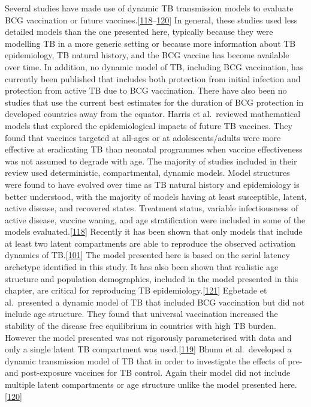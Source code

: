 \documentclass[11pt,twoside]{bristolthesis}
\begin{document}
  Several studies have made use of dynamic TB transmission models to evaluate BCG vaccination or future vaccines.{[}\protect\hyperlink{ref-Harris2016}{118}--\protect\hyperlink{ref-Bhunu2008b}{120}{]} In general, these studies used less detailed models than the one presented here, typically because they were modelling TB in a more generic setting or because more information about TB epidemiology, TB natural history, and the BCG vaccine has become available over time. In addition, no dynamic model of TB, including BCG vaccination, has currently been published that includes both protection from initial infection and protection from active TB due to BCG vaccination. There have also been no studies that use the current best estimates for the duration of BCG protection in developed countries away from the equator. Harris et al.~reviewed mathematical models that explored the epidemiological impacts of future TB vaccines. They found that vaccines targeted at all-ages or at adolescents/adults were more effective at eradicating TB than neonatal programmes when vaccine effectiveness was not assumed to degrade with age. The majority of studies included in their review used deterministic, compartmental, dynamic models. Model structures were found to have evolved over time as TB natural history and epidemiology is better understood, with the majority of models having at least susceptible, latent, active disease, and recovered states. Treatment status, variable infectiousness of active disease, vaccine waning, and age stratification were included in some of the models evaluated.{[}\protect\hyperlink{ref-Harris2016}{118}{]} Recently it has been shown that only models that include at least two latent compartments are able to reproduce the observed activation dynamics of TB.{[}\protect\hyperlink{ref-Ragonnet2017}{101}{]} The model presented here is based on the serial latency archetype identified in this study. It has also been shown that realistic age structure and population demographics, included in the model presented in this chapter, are critical for reproducing TB epidemiology.{[}\protect\hyperlink{ref-Brooks-Pollock2010}{121}{]} Egbetade et al.~presented a dynamic model of TB that included BCG vaccination but did not include age structure. They found that universal vaccination increased the stability of the disease free equilibrium in countries with high TB burden. However the model presented was not rigorously parameterised with data and only a single latent TB compartment was used.{[}\protect\hyperlink{ref-Egbetade2011a}{119}{]} Bhunu et al.~developed a dynamic transmission model of TB that in order to investigate the effects of pre- and post-exposure vaccines for TB control. Again their model did not include multiple latent compartments or age structure unlike the model presented here.{[}\protect\hyperlink{ref-Bhunu2008b}{120}{]}
  
\end{document}
